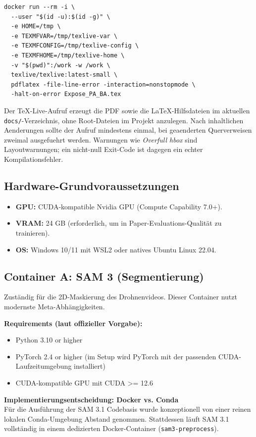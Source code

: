 \documentclass[12pt,a4paper]{article}
\begin{document}
\begin{verbatim}
docker run --rm -i \
  --user "$(id -u):$(id -g)" \
  -e HOME=/tmp \
  -e TEXMFVAR=/tmp/texlive-var \
  -e TEXMFCONFIG=/tmp/texlive-config \
  -e TEXMFHOME=/tmp/texlive-home \
  -v "$(pwd)":/work -w /work \
  texlive/texlive:latest-small \
  pdflatex -file-line-error -interaction=nonstopmode \
  -halt-on-error Expose_PA_BA.tex
\end{verbatim}

Der TeX-Live-Aufruf erzeugt die PDF sowie die LaTeX-Hilfsdateien im aktuellen
\texttt{docs/}-Verzeichnis, ohne Root-Dateien im Projekt anzulegen. Nach
inhaltlichen Aenderungen sollte der Aufruf mindestens einmal, bei geaenderten
Querverweisen zweimal ausgefuehrt werden. Warnungen wie \textit{Overfull hbox}
sind Layoutwarnungen; ein nicht-null Exit-Code ist dagegen ein echter
Kompilationsfehler.

\subsection*{Hardware-Grundvoraussetzungen}
\begin{itemize}[noitemsep]
    \item \textbf{GPU:} CUDA-kompatible Nvidia GPU (Compute Capability 7.0+).
    \item \textbf{VRAM:} 24 GB (erforderlich, um in Paper-Evaluations-Qualität zu trainieren).
    \item \textbf{OS:} Windows 10/11 mit WSL2 oder natives Ubuntu Linux 22.04.
\end{itemize}

\subsection*{Container A: SAM 3 (Segmentierung)}
Zuständig für die 2D-Maskierung des Drohnenvideos. Dieser Container nutzt modernste Meta-Abhängigkeiten.

\textbf{Requirements (laut offizieller Vorgabe):}
\begin{itemize}[noitemsep]
    \item Python 3.10 or higher
    \item PyTorch 2.4 or higher (im Setup wird PyTorch mit der passenden CUDA-Laufzeitumgebung installiert)
    \item CUDA-kompatible GPU mit CUDA >= 12.6
\end{itemize}

\textbf{Implementierungsentscheidung: Docker vs. Conda}\\
Für die Ausführung der SAM 3.1 Codebasis wurde konzeptionell von einer reinen lokalen Conda-Umgebung Abstand genommen. Stattdessen läuft SAM 3.1 vollständig in einem dedizierten Docker-Container (\texttt{sam3-preprocess}).
\end{document}
